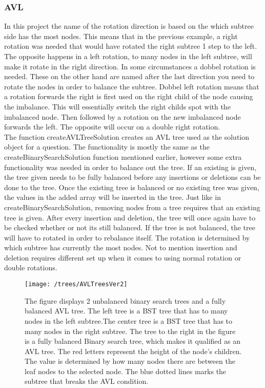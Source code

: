 \subsubsection{AVL}
In this project the name of the rotation direction is based on the which subtree side has the most nodes. This means that in the previous example, a right rotation was needed that would have rotated the right subtree 1 step to the left. The opposite happens in a left rotation, to many nodes in the left subtree, will make it rotate in the right direction. In some circumstances a dobbel rotation is needed. These on the other hand are named after the last direction you need to rotate the nodes in order to balance the subtree. Dobbel left rotation means that a rotation forwards the right is first used on the right child of the node causing the imbalance. This will essentially switch the right childs spot with the imbalanced node. Then followed by a rotation on the new imbalanced node forwards the left. The opposite will occur on a double right rotation.
\\[11pt]
The function createAVLTreeSolution creates an AVL tree used as the solution object for a question. The functionality is mostly the same as the createBinarySearchSolution function mentioned earlier, however some extra functionality was needed in order to balance out the tree. If an existing is given, the tree given needs to be fully balanced before any insertions or deletions can be done to the tree. Once the existing tree is balanced or no existing tree was given, the values in the added array will be inserted in the tree. Just like in createBinarySearchSolution, removing nodes from a tree requires that an existing tree is given. After every insertion and deletion, the tree will once again have to be checked whether or not its still balanced. If the tree is not balanced, the tree will have to rotated in order to rebalance itself. The rotation is determined by which subtree has currently the most nodes. Not to mention insertion and deletion requires different set up when it comes to using normal rotation or double rotations.
\begin{figure}[H]
	\centering
	\texttt{[image: /trees/AVLTreesVer2]}	
	\caption{The figure displays 2 unbalanced binary search trees and a fully balanced AVL tree. The left tree is a BST tree that has to many nodes in the left subtree.The center tree is a BST tree that has to many nodes in the right subtree. The tree to the right in the figure is a fully balanced Binary search tree, which makes it qualified as an AVL tree. The red letters represent the height of the node's children. The value is determined by how many nodes there are between the leaf nodes to the selected node. The blue dotted lines marks the subtree that breaks the AVL condition.}
	\label{fig:AVLTrees}
\end{figure}
